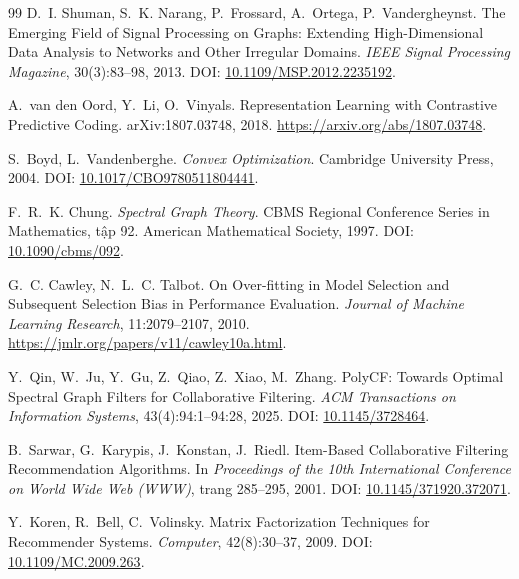 \begin{thebibliography}{99}
D.~I. Shuman, S.~K. Narang, P.~Frossard, A.~Ortega, P.~Vandergheynst.
\newblock The Emerging Field of Signal Processing on Graphs: Extending High-Dimensional Data Analysis to Networks and Other Irregular Domains.
\newblock \emph{IEEE Signal Processing Magazine}, 30(3):83--98, 2013.
\newblock DOI: \href{https://doi.org/10.1109/MSP.2012.2235192}{10.1109/MSP.2012.2235192}.

A.~van den Oord, Y.~Li, O.~Vinyals.
\newblock Representation Learning with Contrastive Predictive Coding.
\newblock arXiv:1807.03748, 2018.
\newblock \url{https://arxiv.org/abs/1807.03748}.


S.~Boyd, L.~Vandenberghe.
\newblock \emph{Convex Optimization}.
\newblock Cambridge University Press, 2004.
\newblock DOI: \href{https://doi.org/10.1017/CBO9780511804441}{10.1017/CBO9780511804441}.

F.~R.~K. Chung.
\newblock \emph{Spectral Graph Theory}.
\newblock CBMS Regional Conference Series in Mathematics, tập 92. American Mathematical Society, 1997.
\newblock DOI: \href{https://doi.org/10.1090/cbms/092}{10.1090/cbms/092}.

G.~C. Cawley, N.~L.~C. Talbot.
\newblock On Over-fitting in Model Selection and Subsequent Selection Bias in Performance Evaluation.
\newblock \emph{Journal of Machine Learning Research}, 11:2079--2107, 2010.
\newblock \url{https://jmlr.org/papers/v11/cawley10a.html}.

Y.~Qin, W.~Ju, Y.~Gu, Z.~Qiao, Z.~Xiao, M.~Zhang.
\newblock PolyCF: Towards Optimal Spectral Graph Filters for Collaborative Filtering.
\newblock \emph{ACM Transactions on Information Systems}, 43(4):94:1--94:28, 2025.
\newblock DOI: \href{https://doi.org/10.1145/3728464}{10.1145/3728464}.

B.~Sarwar, G.~Karypis, J.~Konstan, J.~Riedl.
\newblock Item-Based Collaborative Filtering Recommendation Algorithms.
\newblock In \emph{Proceedings of the 10th International Conference on World Wide Web (WWW)}, trang 285--295, 2001.
\newblock DOI: \href{https://doi.org/10.1145/371920.372071}{10.1145/371920.372071}.

Y.~Koren, R.~Bell, C.~Volinsky.
\newblock Matrix Factorization Techniques for Recommender Systems.
\newblock \emph{Computer}, 42(8):30--37, 2009.
\newblock DOI: \href{https://doi.org/10.1109/MC.2009.263}{10.1109/MC.2009.263}.


\end{thebibliography}
